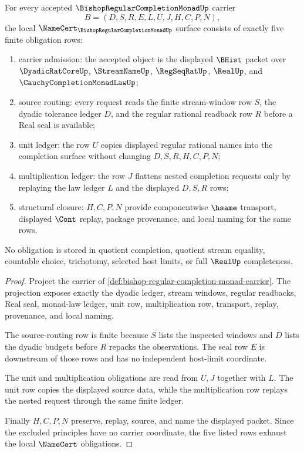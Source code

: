 \begin{theorem}
\label{thm:bishop-regular-completion-monad-namecert-obligations}
For every accepted $\BishopRegularCompletionMonadUp$ carrier
$$
B=(D,S,R,E,L,U,J,H,C,P,N),
$$
the local $\NameCert_{\BishopRegularCompletionMonadUp}$ surface consists of exactly five finite obligation rows:
\begin{enumerate}
\item carrier admission: the accepted object is the displayed $\BHist$ packet over $\DyadicRatCoreUp$, $\StreamNameUp$, $\RegSeqRatUp$, $\RealUp$, and $\CauchyCompletionMonadLawUp$;
\item source routing: every request reads the finite stream-window row $S$, the dyadic tolerance ledger $D$, and the regular rational readback row $R$ before a Real seal is available;
\item unit ledger: the row $U$ copies displayed regular rational names into the completion surface without changing $D,S,R,H,C,P,N$;
\item multiplication ledger: the row $J$ flattens nested completion requests only by replaying the law ledger $L$ and the displayed $D,S,R$ rows;
\item structural closure: $H,C,P,N$ provide componentwise $\hsame$ transport, displayed $\Cont$ replay, package provenance, and local naming for the same rows.
\end{enumerate}
No obligation is stored in quotient completion, quotient stream equality, countable choice, trichotomy, selected host limits, or full $\RealUp$ completeness.
\end{theorem}
\begin{proof}
Project the carrier of \autoref{def:bishop-regular-completion-monad-carrier}. The projection exposes exactly the dyadic ledger, stream windows, regular readbacks, Real seal, monad-law ledger, unit row, multiplication row, transport, replay, provenance, and local naming.

The source-routing row is finite because $S$ lists the inspected windows and $D$ lists the dyadic budgets before $R$ repacks the observations. The seal row $E$ is downstream of those rows and has no independent host-limit coordinate.

The unit and multiplication obligations are read from $U,J$ together with $L$. The unit row copies the displayed source data, while the multiplication row replays the nested request through the same finite ledger.

Finally $H,C,P,N$ preserve, replay, source, and name the displayed packet. Since the excluded principles have no carrier coordinate, the five listed rows exhaust the local $\NameCert$ obligations.
\end{proof}

